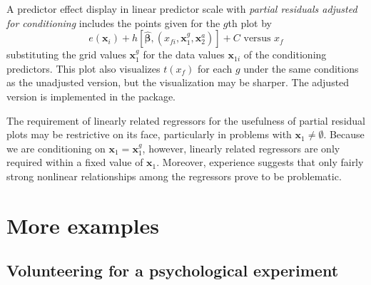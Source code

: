 \documentclass[article]{jss}
\newcommand{\x}{\mathbf{x}}
\newcommand{\bbetahat}{\widehat{\boldsymbol{\beta}}}
\begin{document}
A predictor effect display in linear predictor scale with \emph{partial residuals adjusted for conditioning} includes the points given for the $g$th plot by
\begin{equation}
e(\x_i) + h\left[\bbetahat, (x_{fi}, \x_{1}^g, \x_2^a)\right] + C  \textrm{ versus } x_{f} \label{pe-5}
\end{equation}
substituting the grid values $\x_{1}^g$ for the data values $\x_{1i}$ of the conditioning predictors. This plot also visualizes $t(x_f)$ for each $g$ under the same conditions as the unadjusted version, but the visualization may be sharper. The adjusted version is implemented in the  package.

The requirement of linearly related regressors for the usefulness of partial residual plots may be restrictive on its face, particularly in problems with $\x_1 \neq \emptyset$.  Because we are conditioning on $\x_1 = \x_1^g$, however, linearly related regressors are only required within a fixed value of $\x_1$. Moreover, experience suggests that only fairly strong nonlinear relationships among the regressors prove to be problematic.

\section{More examples}\label{sec-examples}

\subsection{Volunteering for a psychological experiment}
\end{document}
